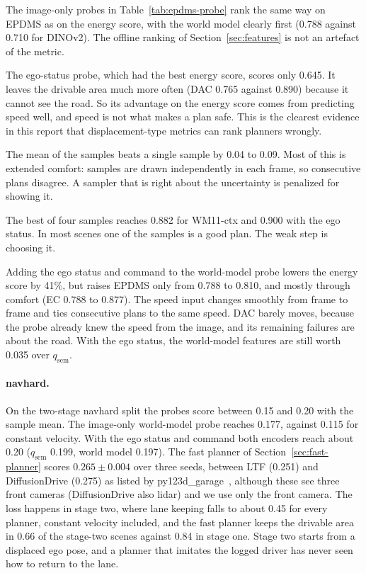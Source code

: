 The image-only probes in Table~\ref{tab:epdms-probe} rank the same way on EPDMS as on the energy score, with the
world model clearly first (0.788 against 0.710 for DINOv2). The offline ranking
of Section~\ref{sec:features} is not an artefact of the metric.

The ego-status probe, which had the best energy score, scores only 0.645. It
leaves the drivable area much more often (DAC 0.765 against 0.890) because it
cannot see the road. So its advantage on the energy score comes from predicting
speed well, and speed is not what makes a plan safe. This is the clearest
evidence in this report that displacement-type metrics can rank planners wrongly.

The mean of the samples beats a single sample by 0.04 to 0.09. Most of this is
extended comfort: samples are drawn independently in each frame, so consecutive
plans disagree. A sampler that is right about the uncertainty is penalized for
showing it.

The best of four samples reaches 0.882 for WM11-ctx and 0.900 with the ego
status. In most scenes one of the samples is a good plan. The weak step is
choosing it.

Adding the ego status and command to the world-model probe lowers the energy
score by 41\%, but raises EPDMS only from 0.788 to 0.810, and mostly through
comfort (EC 0.788 to 0.877). The speed input changes smoothly from frame to frame
and ties consecutive plans to the same speed. DAC barely moves, because the probe
already knew the speed from the image, and its remaining failures are about the
road. With the ego status, the world-model features are still worth 0.035 over
$q_{\text{sem}}$.

\paragraph{navhard.}
On the two-stage navhard split the probes score between 0.15 and 0.20 with the
sample mean. The image-only world-model probe reaches 0.177, against 0.115 for
constant velocity. With the ego status and command both encoders reach about
0.20 ($q_{\text{sem}}$ 0.199, world model 0.197). The fast planner of
Section~\ref{sec:fast-planner} scores $0.265 \pm 0.004$ over three seeds, between
LTF (0.251) and DiffusionDrive (0.275) as listed by py123d\_garage~\cite{py123dgarage},
although these see three front cameras (DiffusionDrive also lidar) and we use only the front camera.
The loss happens in stage two, where lane keeping falls to about 0.45 for every
planner, constant velocity included, and the fast planner keeps the drivable
area in 0.66 of the stage-two scenes against 0.84 in stage one. Stage two starts
from a displaced ego pose, and a planner that imitates the logged driver has
never seen how to return to the lane.

